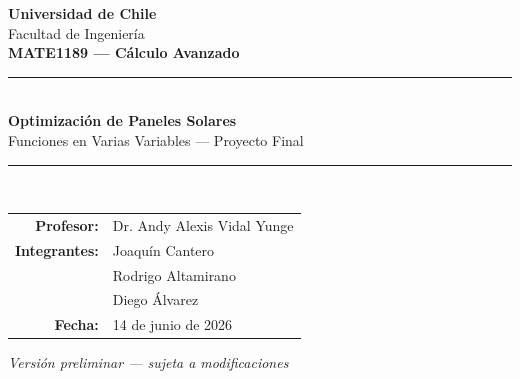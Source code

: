 \begin{titlepage}
\begin{center}

\vspace*{2cm}

{\LARGE \textbf{Universidad de Chile}}\\[0.8cm]
{\Large Facultad de Ingeniería}\\[0.5cm]
{\Large \textbf{MATE1189 --- Cálculo Avanzado}}\\[2cm]

\rule{\linewidth}{0.5mm}\\[0.8cm]
{\Huge \textbf{Optimización de Paneles Solares}}\\[0.4cm]
{\large Funciones en Varias Variables --- Proyecto Final}\\[0.4cm]
\rule{\linewidth}{0.5mm}\\[2.5cm]

\begin{tabular}{rl}
\textbf{Profesor:} & Dr. Andy Alexis Vidal Yunge \\[0.3cm]
\textbf{Integrantes:} & Joaquín Cantero \\[0.15cm]
& Rodrigo Altamirano \\[0.15cm]
& Diego Álvarez \\[0.3cm]
\textbf{Fecha:} & 14 de junio de 2026
\end{tabular}

\vfill

{\small \textit{Versión preliminar --- sujeta a modificaciones}}

\end{center}
\end{titlepage}

